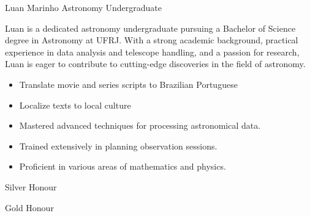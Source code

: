 \documentclass{article}
\begin{document}
\begin{cv}[avatar]{Luan Marinho }{Astronomy Undergraduate}


 Luan is a dedicated astronomy undergraduate pursuing a Bachelor of Science degree in Astronomy at UFRJ. With a strong academic background, practical experience in data analysis and telescope handling, and a passion for research, Luan is eager to contribute to cutting-edge discoveries in the field of astronomy.



\begin{cvevent}[present][2022]
    \begin{itemize}
        \item Translate movie and series scripts to Brazilian Portuguese 
        \item Localize texts to local culture
    \end{itemize}
\end{cvevent}



\begin{cvevent}[present][2022]
    \begin{itemize}
        \item Mastered advanced techniques for processing astronomical data.
        \item Trained extensively in planning observation sessions.
        \item Proficient in various areas of mathematics and physics.
    \end{itemize}
\end{cvevent}




\begin{cvevent}[2021]
Silver Honour
\end{cvevent}

\begin{cvevent}[2020]
    Gold Honour
\end{cvevent}



\end{cv}
\end{document}
